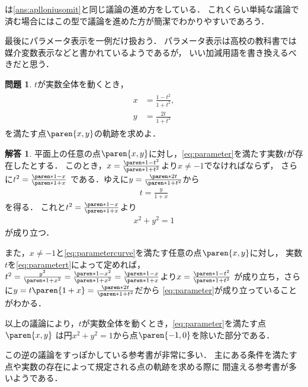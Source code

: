 \documentclass[11pt,a4paper]{ltjsarticle}
\newcommand*{\coord}[1]{\paren{#1}}
\theoremstyle{definition}
\newtheorem{que}[dfn]{問題}
\newtheorem{ans}[dfn]{解答}
\begin{document}
は\cref{ans:aplloniusomit}と同じ議論の進め方をしている．
これくらい単純な議論で済む場合にはこの型で議論を進めた方が簡潔でわかりやすいであろう．

最後にパラメータ表示を一例だけ扱おう．
パラメータ表示は高校の教科書では媒介変数表示などと書かれているようであるが，
いい加減用語を書き換えるべきだと思う．

\begin{que} \label{que:parameter}
  $t$が実数全体を動くとき，
  \begin{align}
    \begin{aligned}
      x & = \frac{1 - t^2}{1 + t^2}, \\
      y & = \frac{2t}{1 + t^2}
    \end{aligned}
    \label{eq:parameter}
  \end{align}
  を満たす点$\coord{x, y}$の軌跡を求めよ．
\end{que}

\begin{ans} \label{ans:parameter}
  平面上の任意の点$\coord{x, y}$に対し，\cref{eq:parameter}を満たす実数$t$が存在したとする．
  このとき，$x = \frac{\paren*{1 - t^2}}{\paren*{1 + t^2}}$より$x \neq -1$でなければならず，
  さらに$t^2 = \frac{\paren*{1 - x}}{\paren*{1 + x}}$
  である．ゆえに$y = \frac{\paren*{2t}}{\paren*{1 + t^2}}$から
  \begin{align}
    t = \frac{y}{1 + x}
    \label{eq:parametert}
  \end{align}
  を得る．
  これと$t^2 = \frac{\paren*{1 - x}}{\paren*{1 + x}}$より
  \begin{align}
    x^2 + y^2 = 1
    \label{eq:parametercurve}
  \end{align}
  が成り立つ．

  また，$x \neq -1$と\cref{eq:parametercurve}を満たす任意の点$\coord{x, y}$に対し，
  実数$t$を\cref{eq:parametert}によって定めれば，
  $t^2 = \frac{y^2}{\paren*{1 + x}^2} = \frac{\paren*{1 - x^2}}{\paren*{1 + x}^2} 
  = \frac{\paren*{1 - x}}{\paren*{1 + x}}$より$x = \frac{\paren*{1 - t^2}}{\paren*{1 + t^2}}$
  が成り立ち，さらに$y = t \paren{1 + x} = \frac{\paren*{2t}}{\paren*{1 + t^2}}$だから
  \cref{eq:parameter}が成り立っていることがわかる．

  以上の議論により，$t$が実数全体を動くとき，\cref{eq:parameter}を満たす点$\coord{x,y}$
  は円$x^2 + y^2 = 1$から点$\coord{-1, 0}$を除いた部分である．
\end{ans}

この逆の議論をすっぽかしている参考書が非常に多い．
主にある条件を満たす点や実数の存在によって規定される点の軌跡を求める際に
間違える参考書が多いようである．
\end{document}

